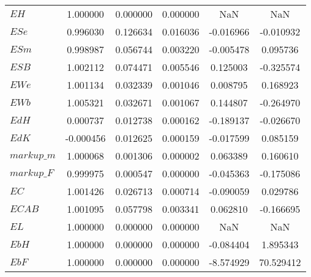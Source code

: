 \begin{center}
\begin{longtable}{lccccc}
$EH                         $	 & 	        1.000000	 & 	        0.000000	 & 	        0.000000	 & 	             NaN	 & 	             NaN \\ 
$ESe                        $	 & 	        0.996030	 & 	        0.126634	 & 	        0.016036	 & 	       -0.016966	 & 	       -0.010932 \\ 
$ESm                        $	 & 	        0.998987	 & 	        0.056744	 & 	        0.003220	 & 	       -0.005478	 & 	        0.095736 \\ 
$ESB                        $	 & 	        1.002112	 & 	        0.074471	 & 	        0.005546	 & 	        0.125003	 & 	       -0.325574 \\ 
$EWe                        $	 & 	        1.001134	 & 	        0.032339	 & 	        0.001046	 & 	        0.008795	 & 	        0.168923 \\ 
$EWb                        $	 & 	        1.005321	 & 	        0.032671	 & 	        0.001067	 & 	        0.144807	 & 	       -0.264970 \\ 
$EdH                        $	 & 	        0.000737	 & 	        0.012738	 & 	        0.000162	 & 	       -0.189137	 & 	       -0.026670 \\ 
$EdK                        $	 & 	       -0.000456	 & 	        0.012625	 & 	        0.000159	 & 	       -0.017599	 & 	        0.085159 \\ 
$markup\_m                  $	 & 	        1.000068	 & 	        0.001306	 & 	        0.000002	 & 	        0.063389	 & 	        0.160610 \\ 
$markup\_F                  $	 & 	        0.999975	 & 	        0.000547	 & 	        0.000000	 & 	       -0.045363	 & 	       -0.175086 \\ 
$EC                         $	 & 	        1.001426	 & 	        0.026713	 & 	        0.000714	 & 	       -0.090059	 & 	        0.029786 \\ 
$ECAB                       $	 & 	        1.001095	 & 	        0.057798	 & 	        0.003341	 & 	        0.062810	 & 	       -0.166695 \\ 
$EL                         $	 & 	        1.000000	 & 	        0.000000	 & 	        0.000000	 & 	             NaN	 & 	             NaN \\ 
$EbH                        $	 & 	        1.000000	 & 	        0.000000	 & 	        0.000000	 & 	       -0.084404	 & 	        1.895343 \\ 
$EbF                        $	 & 	        1.000000	 & 	        0.000000	 & 	        0.000000	 & 	       -8.574929	 & 	       70.529412 \\ 

\end{longtable}
\end{center}
